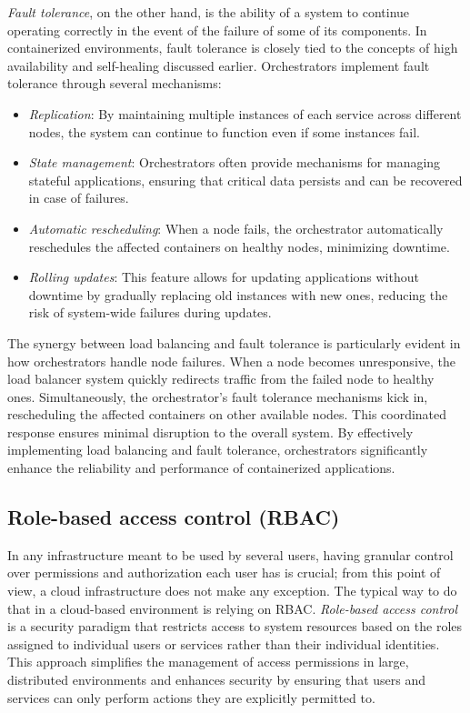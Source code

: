 \textit{Fault tolerance}, on the other hand, is the ability of a system to
continue operating correctly in the event of the failure of some of its
components.
In containerized environments, fault tolerance is closely tied to the concepts
of high availability and self-healing discussed earlier.
Orchestrators implement fault tolerance through several mechanisms:
\begin{itemize}
  \itemsep0em
  \item \textit{Replication}: By maintaining multiple instances of each service
    across different nodes, the system can continue to function even if some
    instances fail.
  \item \textit{State management}: Orchestrators often provide mechanisms for
    managing stateful applications, ensuring that critical data persists and can
    be recovered in case of failures.
  \item \textit{Automatic rescheduling}: When a node fails, the orchestrator
    automatically reschedules the affected containers on healthy nodes,
    minimizing downtime.
  \item \textit{Rolling updates}: This feature allows for updating applications
    without downtime by gradually replacing old instances with new ones,
    reducing the risk of system-wide failures during updates.
\end{itemize}

The synergy between load balancing and fault tolerance is particularly evident
in how orchestrators handle node failures.
When a node becomes unresponsive, the load balancer system quickly redirects traffic
from the failed node to healthy ones.
Simultaneously, the orchestrator's fault tolerance mechanisms kick in,
rescheduling the affected containers on other available nodes. This coordinated
response ensures minimal disruption to the overall system.
By effectively implementing load balancing and fault tolerance, orchestrators
significantly enhance the reliability and performance of containerized
applications.

\subsection{Role-based access control (RBAC)}\label{subsec:chpt1-rbac}

In any infrastructure meant to be used by several users, having granular
control over permissions and authorization each user has is crucial; from this
point of view, a cloud infrastructure does not make any exception.
The typical way to do that in a cloud-based environment is relying on RBAC.
\textit{Role-based access control} is a security paradigm that restricts
access to system resources based on the roles assigned to individual users or
services rather than their individual identities.
This approach simplifies the management of access permissions in large,
distributed environments and enhances security by ensuring that users and
services can only perform actions they are explicitly permitted to.

